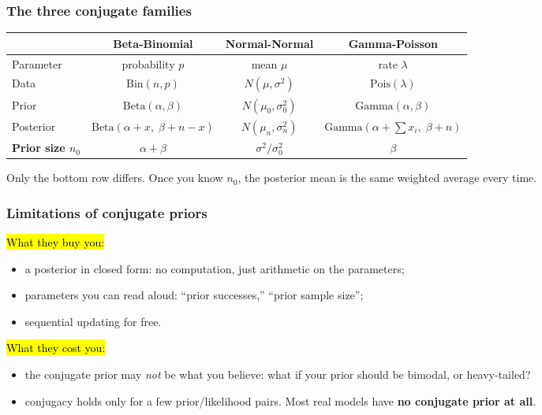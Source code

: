 \documentclass[slidestop,compress,mathserif]{beamer}
\begin{document}
\begin{frame}
\frametitle{The three conjugate families}

\vspace{-0.2em}
\begin{center}
{\scriptsize
\renewcommand{\arraystretch}{1.5}
\begin{tabular}{lccc}
\toprule
 & \textbf{Beta-Binomial} & \textbf{Normal-Normal} & \textbf{Gamma-Poisson} \\
\midrule
Parameter & probability $p$ & mean $\mu$ & rate $\lambda$ \\
Data & $\text{Bin}(n,p)$ & $N(\mu, \sigma^2)$ & $\text{Pois}(\lambda)$ \\
Prior & $\text{Beta}(\alpha,\beta)$ & $N(\mu_0, \sigma_0^2)$ & $\text{Gamma}(\alpha,\beta)$ \\
Posterior & $\text{Beta}(\alpha\!+\!x,\; \beta\!+\!n\!-\!x)$ & $N(\mu_n, \sigma_n^2)$ & $\text{Gamma}(\alpha\!+\!\textstyle\sum x_i,\; \beta\!+\!n)$ \\
\textbf{Prior size $n_0$} & $\alpha + \beta$ & $\sigma^2/\sigma_0^2$ & $\beta$ \\
\bottomrule
\end{tabular}}
\end{center}

\pause
{\small Only the bottom row differs. Once you know $n_0$, the posterior mean is the same weighted average every time.}

\end{frame}

\begin{frame}
\frametitle{Limitations of conjugate priors}

\hl{What they buy you:}
\begin{itemize}
\item a posterior in closed form: no computation, just arithmetic on the parameters;
\item parameters you can read aloud: ``prior successes,'' ``prior sample size'';
\item sequential updating for free.
\end{itemize}

\pause
\medskip

\hl{What they cost you:}
\begin{itemize}
\item the conjugate prior may \emph{not} be what you believe: what if your prior should be bimodal, or heavy-tailed?
\pause
\item conjugacy holds only for a few prior/likelihood pairs. Most real models have \textbf{no conjugate prior at all}.
\end{itemize}

\end{frame}
\end{document}

